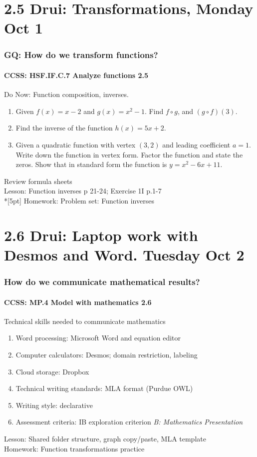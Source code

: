 \documentclass{beamer}
\begin{document}
\section{2.5 Drui: Transformations, Monday Oct 1}
  \frame
  {
    \frametitle{GQ: How do we transform functions?}
    \framesubtitle{CCSS: HSF.IF.C.7 Analyze functions    \alert{2.5}}

    \begin{block}{Do Now: Function composition, inverses.}
    \begin{enumerate}
        \item Given $f(x)=x-2$ and $g(x)=x^2-1$. Find $f \circ g$, and $(g \circ f)(3)$.
        \item Find the inverse of the function $h(x)=5x+2$.
        \item Given a quadratic function with vertex $(3,2)$ and leading coefficient $a=1$. Write down the function in vertex form. Factor the function and state the zeros. Show that in standard form the function is $y=x^2-6x+11$.
    \end{enumerate}
    \end{block}
    Review formula sheets\\
    Lesson: Function inverses p 21-24; Exercise 1I p.1-7 \\*[5pt]
    Homework: Problem set: Function inverses
  }

\section{2.6 Drui: Laptop work with Desmos and Word. Tuesday Oct 2}
  \frame
  {
    \frametitle{How do we communicate mathematical results?}
    \framesubtitle{CCSS: MP.4 Model with mathematics  \alert{2.6}}

    \begin{block}{Technical skills needed to communicate mathematics}
    \begin{enumerate}
        \item Word processing: Microsoft Word and equation editor
        \item Computer calculators: Desmos; domain restriction, labeling
        \item Cloud storage: Dropbox
        \item Technical writing standards: MLA format (Purdue OWL)
        \item Writing style: declarative
        \item Assessment criteria: IB exploration criterion \emph{B: Mathematics Presentation}
    \end{enumerate}
    \end{block}
    Lesson: Shared folder structure, graph copy/paste, MLA template\\ \bigskip
    Homework: Function transformations practice
  }
\end{document}

